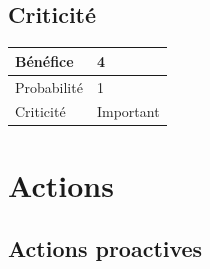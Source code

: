 \subsection*{Criticité}

\begin{table}[h]
\centering
	\begin{tabularx}{16.8cm}{|>{}X|X|}
	\hline
	Bénéfice & 4\\
	\hline
	Probabilité & 1\\
	\hline
	Criticité & Important\\
	\hline
	\end{tabularx}
\end{table}
\newpage

\section*{Actions}
\subsection*{Actions proactives}

